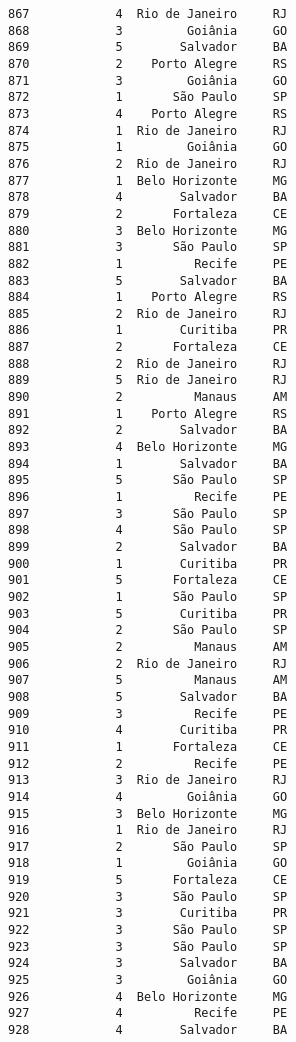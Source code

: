 \documentclass[11pt]{article}
\begin{document}
\begin{Verbatim}[commandchars=\\\{\}]
867            4  Rio de Janeiro     RJ  
868            3         Goiânia     GO  
869            5        Salvador     BA  
870            2    Porto Alegre     RS  
871            3         Goiânia     GO  
872            1       São Paulo     SP  
873            4    Porto Alegre     RS  
874            1  Rio de Janeiro     RJ  
875            1         Goiânia     GO  
876            2  Rio de Janeiro     RJ  
877            1  Belo Horizonte     MG  
878            4        Salvador     BA  
879            2       Fortaleza     CE  
880            3  Belo Horizonte     MG  
881            3       São Paulo     SP  
882            1          Recife     PE  
883            5        Salvador     BA  
884            1    Porto Alegre     RS  
885            2  Rio de Janeiro     RJ  
886            1        Curitiba     PR  
887            2       Fortaleza     CE  
888            2  Rio de Janeiro     RJ  
889            5  Rio de Janeiro     RJ  
890            2          Manaus     AM  
891            1    Porto Alegre     RS  
892            2        Salvador     BA  
893            4  Belo Horizonte     MG  
894            1        Salvador     BA  
895            5       São Paulo     SP  
896            1          Recife     PE  
897            3       São Paulo     SP  
898            4       São Paulo     SP  
899            2        Salvador     BA  
900            1        Curitiba     PR  
901            5       Fortaleza     CE  
902            1       São Paulo     SP  
903            5        Curitiba     PR  
904            2       São Paulo     SP  
905            2          Manaus     AM  
906            2  Rio de Janeiro     RJ  
907            5          Manaus     AM  
908            5        Salvador     BA  
909            3          Recife     PE  
910            4        Curitiba     PR  
911            1       Fortaleza     CE  
912            2          Recife     PE  
913            3  Rio de Janeiro     RJ  
914            4         Goiânia     GO  
915            3  Belo Horizonte     MG  
916            1  Rio de Janeiro     RJ  
917            2       São Paulo     SP  
918            1         Goiânia     GO  
919            5       Fortaleza     CE  
920            3       São Paulo     SP  
921            3        Curitiba     PR  
922            3       São Paulo     SP  
923            3       São Paulo     SP  
924            3        Salvador     BA  
925            3         Goiânia     GO  
926            4  Belo Horizonte     MG  
927            4          Recife     PE  
928            4        Salvador     BA  

\end{Verbatim}
\end{document}
